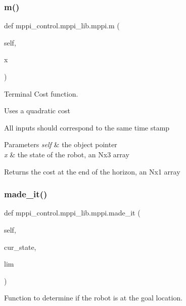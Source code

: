 \subsubsection{\texorpdfstring{m()}{m()}}
{\footnotesize\ttfamily def mppi\+\_\+control.\+mppi\+\_\+lib.\+mppi.\+m (\begin{DoxyParamCaption}\item[{}]{self,  }\item[{}]{x }\end{DoxyParamCaption})}



Terminal Cost function. 

Uses a quadratic cost

All inputs should correspond to the same time stamp 
\begin{DoxyParams}{Parameters}
{\em self} & the object pointer \\
\hline
{\em x} & the state of the robot, an Nx3 array\\
\hline
\end{DoxyParams}
\begin{DoxyReturn}{Returns}
the cost at the end of the horizon, an Nx1 array 
\end{DoxyReturn}
\mbox{\label{classmppi__control_1_1mppi__lib_1_1mppi_a2701aeac8683ceecbd4d86303f4c3647}} 
\subsubsection{\texorpdfstring{made\+\_\+it()}{made\_it()}}
{\footnotesize\ttfamily def mppi\+\_\+control.\+mppi\+\_\+lib.\+mppi.\+made\+\_\+it (\begin{DoxyParamCaption}\item[{}]{self,  }\item[{}]{cur\+\_\+state,  }\item[{}]{lim }\end{DoxyParamCaption})}



Function to determine if the robot is at the goal location. 


